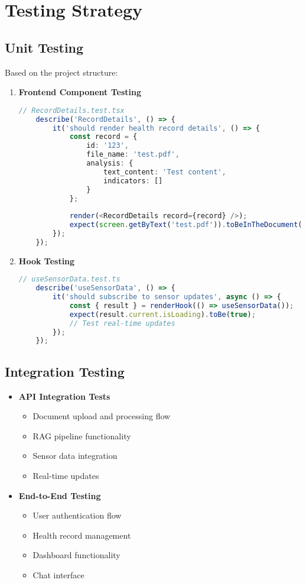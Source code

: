 \section{Testing Strategy}
\subsection{Unit Testing}
Based on the project structure:

\begin{enumerate}
    \item \textbf{Frontend Component Testing}
    \begin{lstlisting}[language=typescript]
    // RecordDetails.test.tsx
    describe('RecordDetails', () => {
        it('should render health record details', () => {
            const record = {
                id: '123',
                file_name: 'test.pdf',
                analysis: {
                    text_content: 'Test content',
                    indicators: []
                }
            };
            
            render(<RecordDetails record={record} />);
            expect(screen.getByText('test.pdf')).toBeInTheDocument();
        });
    });
    \end{lstlisting}

    \item \textbf{Hook Testing}
    \begin{lstlisting}[language=typescript]
    // useSensorData.test.ts
    describe('useSensorData', () => {
        it('should subscribe to sensor updates', async () => {
            const { result } = renderHook(() => useSensorData());
            expect(result.current.isLoading).toBe(true);
            // Test real-time updates
        });
    });
    \end{lstlisting}
\end{enumerate}

\subsection{Integration Testing}
\begin{itemize}
    \item \textbf{API Integration Tests}
    \begin{itemize}
        \item Document upload and processing flow
        \item RAG pipeline functionality
        \item Sensor data integration
        \item Real-time updates
    \end{itemize}

    \item \textbf{End-to-End Testing}
    \begin{itemize}
        \item User authentication flow
        \item Health record management
        \item Dashboard functionality
        \item Chat interface
    \end{itemize}
\end{itemize} 